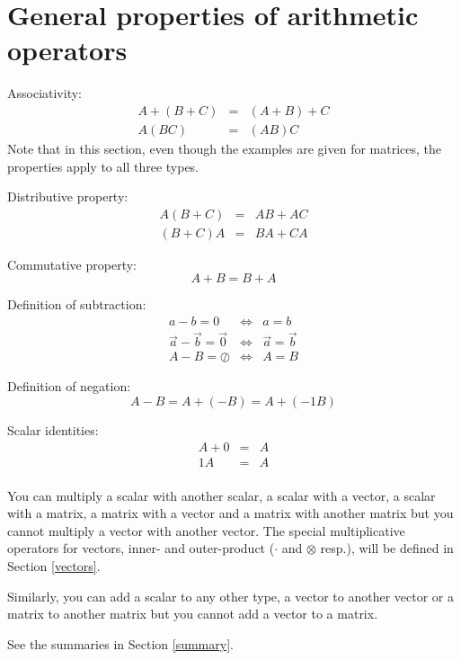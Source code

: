 \documentclass{article}
\newcommand{\inner}{\cdot}
\renewcommand{\outer}{\otimes}
\newcommand{\zeromatrix}{\oslash}
\begin{document}
\section{General properties of arithmetic operators}

Associativity:
\begin{eqnarray}
	A + (B + C) & = & (A + B) + C \\
	A(BC) & = & (AB)C
\end{eqnarray}
Note that in this section, even though the examples are given for matrices,
the properties apply to all three types.

Distributive property:
\begin{eqnarray}
	A (B + C) & = & A B + A C \\
	(B + C) A & = & B A + C A
\end{eqnarray}

Commutative property:
\begin{equation}
	A + B = B + A
\end{equation}

Definition of subtraction:
\begin{eqnarray}
	a - b = 0 & \iff & a = b \\
	\vec a - \vec b = \vec 0 & \iff & \vec a = \vec b \\
	A - B = \zeromatrix & \iff & A = B
\end{eqnarray}

Definition of negation:
\begin{equation}
	A - B = A + (- B) = A + (-1 B)
\end{equation}

Scalar identities:
\begin{eqnarray}
	A + 0 & = & A \\
	1 A & = & A \\
\end{eqnarray}

You can multiply a scalar with another scalar,
a scalar with a vector, a scalar with a matrix, a 
matrix with a vector and a matrix with another matrix but you cannot
multiply a vector with another vector.
The special multiplicative operators for vectors, inner- and outer-product
($\inner$ and $\outer$ resp.), will be defined in Section \ref{vectors}.

Similarly, you can add a scalar to any other type, a vector to another
vector or a matrix to another matrix but you cannot add a vector to
a matrix.

See the summaries in Section \ref{summary}.
\end{document}
